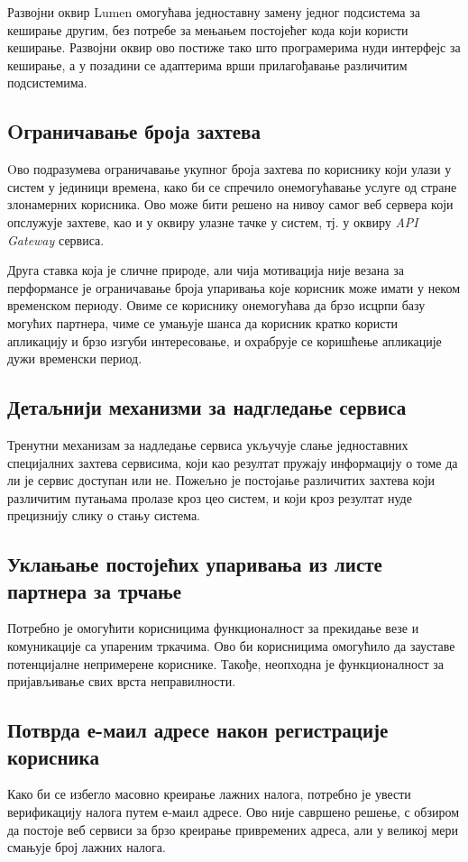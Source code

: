 \documentclass[12pt,oneside]{memoir}
\begin{document}
Развојни оквир Lumen омогућава једноставну замену једног подсистема за кеширање другим, без потребе за мењањем постојећег кода који користи кеширање. Развојни оквир ово постиже тако што програмерима нуди интерфејс за кеширање, а у позадини се адаптерима врши прилагођавање различитим подсистемима.

\subsection{Oграничавање броја захтева}
Oво подразумева ограничавање укупног броја захтева по кориснику који улази у систем у јединици времена, како би се спречило онемогућавање услуге од стране злонамерних корисника. Ово може бити решено на нивоу самог веб сервера који опслужује захтеве, као и у оквиру улазне тачке у систем, тј. у оквиру \textit{API Gateway} сервиса.

Друга ставка која је сличне природе, али чија мотивација није везана за перформансе је ограничавање броја упаривања које корисник може имати у неком временском периоду. Овиме се кориснику онемогућава да брзо исцрпи базу могућих партнера, чиме се умањује шанса да корисник кратко користи апликацију и брзо изгуби интересовање, и охрабрује се коришћење апликације дужи временски период.

\subsection{Детаљнији механизми за надгледање сервиса}
Тренутни механизам за надледање сервиса укључује слање једноставних специјалних захтева сервисима, који као резултат пружају информацију о томе да ли је сервис доступан или не. Пожељно је постојање различитих захтева који различитим путањама пролазе кроз цео систем, и који кроз резултат нуде прецизнију слику о стању система.

\subsection{Уклањање постојећих упаривања из листе партнера за трчање}
Потребно је омогућити корисницима функционалност за прекидање везе и комуникације са упареним тркачима. Ово би корисницима омогућило да зауставе потенцијалне непримерене кориснике. Такође, неопходна је функционалност за пријављивање свих врста неправилности.

\subsection{Потврда е-маил адресе након регистрације корисника}
Како би се избегло масовно креирање лажних налога, потребно је увести верификацију налога путем е-маил адресе. Ово није савршено решење, с обзиром да постоје веб сервиси за брзо креирање привремених адреса, али у великој мери смањује број лажних налога.
\end{document}
